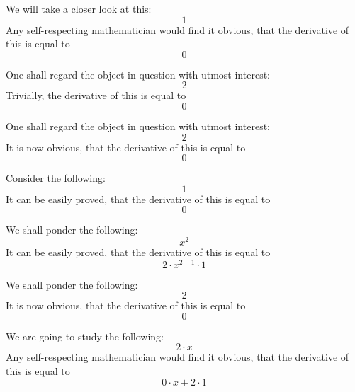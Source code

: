 \documentclass{article}
\begin{document}
We will take a closer look at this:
\begin{equation}
1 
\end{equation}
Any self-respecting mathematician would find it obvious, that the derivative of this is equal to
\begin{equation}
0 
\end{equation}

One shall regard the object in question with utmost interest:
\begin{equation}
2 
\end{equation}
Trivially, the derivative of this is equal to
\begin{equation}
0 
\end{equation}

One shall regard the object in question with utmost interest:
\begin{equation}
2 
\end{equation}
It is now obvious, that the derivative of this is equal to
\begin{equation}
0 
\end{equation}

Consider the following:
\begin{equation}
1 
\end{equation}
It can be easily proved, that the derivative of this is equal to
\begin{equation}
0 
\end{equation}

We shall ponder the following:
\begin{equation}
x ^{2 } 
\end{equation}
It can be easily proved, that the derivative of this is equal to
\begin{equation}
2 \cdot x ^{2 - 1 } \cdot 1 
\end{equation}

We shall ponder the following:
\begin{equation}
2 
\end{equation}
It is now obvious, that the derivative of this is equal to
\begin{equation}
0 
\end{equation}

We are going to study the following:
\begin{equation}
2 \cdot x 
\end{equation}
Any self-respecting mathematician would find it obvious, that the derivative of this is equal to
\begin{equation}
0 \cdot x + 2 \cdot 1 
\end{equation}
\end{document}
